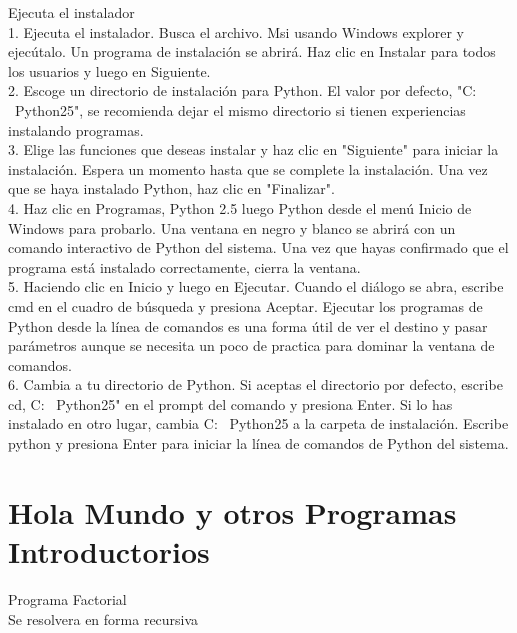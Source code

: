 \documentclass[11pt]{article} %
\begin{document}
Ejecuta el instalador\\

1.	Ejecuta el instalador. Busca el archivo. Msi usando Windows explorer y ejecútalo. Un programa de instalación se abrirá. Haz clic en Instalar para todos los usuarios y luego en Siguiente.\\

2.	Escoge un directorio de instalación para Python. El valor por defecto, "C: \ Python25", se recomienda dejar el mismo directorio si tienen experiencias instalando programas.\\

3.	Elige las funciones que deseas instalar y haz clic en "Siguiente" para iniciar la instalación. Espera un momento hasta que se complete la instalación. Una vez que se haya instalado Python, haz clic en "Finalizar".\\

4.	Haz clic en Programas, Python 2.5 luego Python desde el menú Inicio de Windows para probarlo. Una ventana en negro y blanco se abrirá con un comando interactivo de Python del sistema. Una vez que hayas confirmado que el programa está instalado correctamente, cierra la ventana.\\

5.	Haciendo clic en Inicio y luego en Ejecutar. Cuando el diálogo se abra, escribe cmd en el cuadro de búsqueda y presiona Aceptar. Ejecutar los programas de Python desde la línea de comandos es una forma útil de ver el destino y pasar parámetros aunque se necesita un poco de practica para dominar la ventana de comandos.\\

6.	Cambia a tu directorio de Python. Si aceptas el directorio por defecto, escribe cd,  C: \ Python25" en el prompt del comando y presiona Enter. Si lo has instalado en otro lugar, cambia C: \ Python25 a la carpeta de instalación. Escribe python y presiona Enter para iniciar la línea de comandos de Python del sistema.\\


\section{Hola Mundo y otros Programas Introductorios}

 Programa Factorial
  \\  
 Se resolvera en forma recursiva


\lstset{language=Pascal}          %
\end{document}
